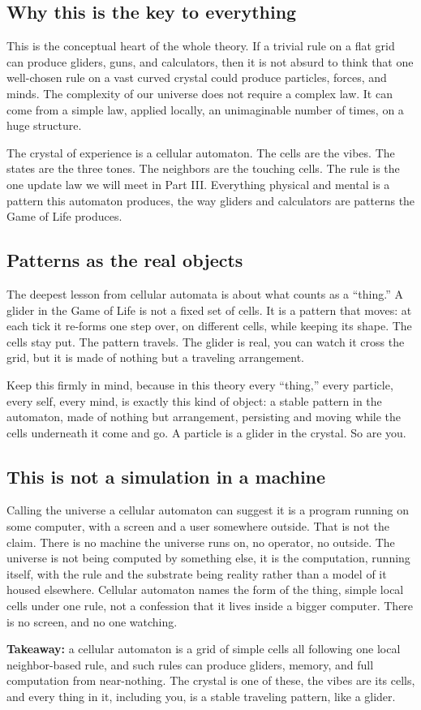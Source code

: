 \subsection{Why this is the key to everything}

This is the conceptual heart of the whole theory. If a trivial rule on a flat grid can produce gliders, guns, and calculators, then it is not absurd to think that one well-chosen rule on a vast curved crystal could produce particles, forces, and minds. The complexity of our universe does not require a complex law. It can come from a simple law, applied locally, an unimaginable number of times, on a huge structure.

The crystal of experience is a cellular automaton. The cells are the vibes. The states are the three tones. The neighbors are the touching cells. The rule is the one update law we will meet in Part III. Everything physical and mental is a pattern this automaton produces, the way gliders and calculators are patterns the Game of Life produces.

\subsection{Patterns as the real objects}

The deepest lesson from cellular automata is about what counts as a ``thing.'' A glider in the Game of Life is not a fixed set of cells. It is a pattern that moves: at each tick it re-forms one step over, on different cells, while keeping its shape. The cells stay put. The pattern travels. The glider is real, you can watch it cross the grid, but it is made of nothing but a traveling arrangement.

Keep this firmly in mind, because in this theory every ``thing,'' every particle, every self, every mind, is exactly this kind of object: a stable pattern in the automaton, made of nothing but arrangement, persisting and moving while the cells underneath it come and go. A particle is a glider in the crystal. So are you.

\subsection{This is not a simulation in a machine}

Calling the universe a cellular automaton can suggest it is a program running on some computer, with a screen and a user somewhere outside. That is not the claim. There is no machine the universe runs on, no operator, no outside. The universe is not being computed by something else, it is the computation, running itself, with the rule and the substrate being reality rather than a model of it housed elsewhere. Cellular automaton names the form of the thing, simple local cells under one rule, not a confession that it lives inside a bigger computer. There is no screen, and no one watching.

\textbf{Takeaway:} a cellular automaton is a grid of simple cells all following one local neighbor-based rule, and such rules can produce gliders, memory, and full computation from near-nothing. The crystal is one of these, the vibes are its cells, and every thing in it, including you, is a stable traveling pattern, like a glider.
